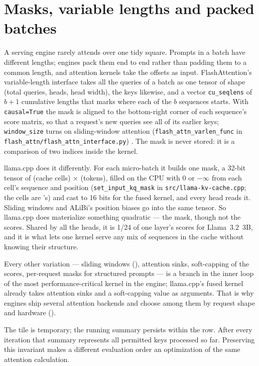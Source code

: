 \section{Masks, variable lengths and packed batches}

A serving engine rarely attends over one tidy square. Prompts in a batch have
different lengths; engines pack them end to end rather than padding them to a
common length, and attention kernels take the offsets as input.
FlashAttention's variable-length interface takes all the queries of a batch as
one tensor of shape (total queries, heads, head width), the keys likewise, and
a vector \texttt{cu\_seqlens} of $b + 1$ cumulative lengths that marks where
each of the $b$ sequences starts. With \texttt{causal=True} the mask is aligned
to the bottom-right corner of each sequence's score matrix, so that a request's
new queries see all of its earlier keys; \texttt{window\_size} turns on
sliding-window attention (\texttt{flash\_attn\_varlen\_func} in
\texttt{flash\_attn/flash\_attn\_interface.py}) \cite{daoailab2026flashattnrepo}.
The mask is never stored: it is a comparison of two indices inside the kernel.

llama.cpp does it differently. For each micro-batch it builds one mask, a
32-bit tensor of (cache cells) $\times$ (tokens), filled on the CPU with 0 or
$-\infty$ from each cell's sequence and position (\texttt{set\_input\_kq\_mask} in
\texttt{src/llama-kv-cache.cpp}; the cells are 's) and cast to 16
bits for the fused kernel, and every head reads it. Sliding windows and ALiBi's
position biases go into the same tensor. So llama.cpp does materialize something
quadratic --- the mask, though not the scores. Shared by all the heads, it is
1/24 of one layer's scores for Llama~3.2~3B, and it is what lets one kernel
serve any mix of sequences in the cache without knowing their structure.

Every other variation --- sliding windows (), attention
sinks, soft-capping of the scores, per-request masks for structured prompts
--- is a branch in the inner loop of the most performance-critical kernel in
the engine; llama.cpp's fused kernel already takes attention sinks and a
soft-capping value as arguments. That is why engines ship several attention backends and choose
among them by request shape and hardware ().

The tile is temporary; the running summary persists within the row. After every iteration that summary represents all permitted keys processed so far. Preserving this invariant makes a different evaluation order an optimization of the same attention calculation.

